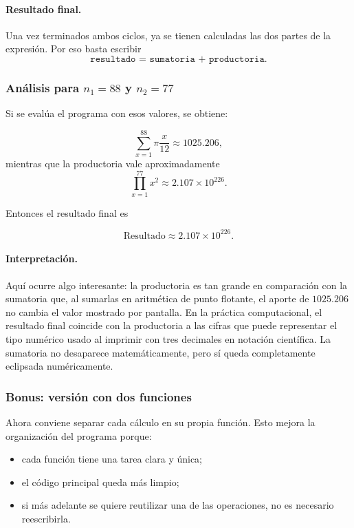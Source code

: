 \begin{solution}
\paragraph{Resultado final.}
Una vez terminados ambos ciclos, ya se tienen calculadas las dos partes de la expresión. Por eso basta escribir
\[
\texttt{resultado = sumatoria + productoria}.
\]

\subsubsection*{Análisis para \(n_1=88\) y \(n_2=77\)}

Si se evalúa el programa con esos valores, se obtiene:

\[
\sum_{x=1}^{88} \pi\frac{x}{12} \approx 1025.206,
\]
mientras que la productoria vale aproximadamente
\[
\prod_{x=1}^{77} x^{2} \approx 2.107\times 10^{226}.
\]

Entonces el resultado final es

\[
\text{Resultado} \approx 2.107\times 10^{226}.
\]

\paragraph{Interpretación.}
Aquí ocurre algo interesante: la productoria es tan grande en comparación con la sumatoria que, al sumarlas en aritmética de punto flotante, el aporte de \(1025.206\) no cambia el valor mostrado por pantalla. En la práctica computacional, el resultado final coincide con la productoria a las cifras que puede representar el tipo numérico usado al imprimir con tres decimales en notación científica. La sumatoria no desaparece matemáticamente, pero sí queda completamente eclipsada numéricamente.

\subsubsection*{Bonus: versión con dos funciones}

Ahora conviene separar cada cálculo en su propia función. Esto mejora la organización del programa porque:

\begin{itemize}
    \item cada función tiene una tarea clara y única;
    \item el código principal queda más limpio;
    \item si más adelante se quiere reutilizar una de las operaciones, no es necesario reescribirla.
\end{itemize}


\end{solution}
